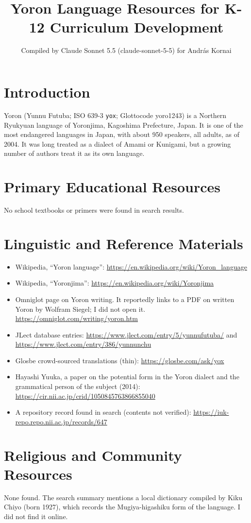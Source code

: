 \documentclass[12pt]{article}
\title{Yoron Language Resources for K-12 Curriculum Development}
\author{Compiled by Claude Sonnet 5.5 (claude-sonnet-5-5) for Andr\'as Kornai}
\date{}
\begin{document}
\maketitle

\section{Introduction}
Yoron (Yunnu Futuba; ISO 639-3 \texttt{yox}; Glottocode yoro1243) is a Northern Ryukyuan language of Yoronjima, Kagoshima Prefecture, Japan. It is one of the most endangered languages in Japan, with about 950 speakers, all adults, as of 2004. It was long treated as a dialect of Amami or Kunigami, but a growing number of authors treat it as its own language.

\section{Primary Educational Resources}
No school textbooks or primers were found in search results.

\section{Linguistic and Reference Materials}
\begin{itemize}
\item Wikipedia, ``Yoron language'': \url{https://en.wikipedia.org/wiki/Yoron_language}
\item Wikipedia, ``Yoronjima'': \url{https://en.wikipedia.org/wiki/Yoronjima}
\item Omniglot page on Yoron writing. It reportedly links to a PDF on written Yoron by Wolfram Siegel; I did not open it. \url{https://omniglot.com/writing/yoron.htm}
\item JLect database entries: \url{https://www.jlect.com/entry/5/yunnufutuba/} and \url{https://www.jlect.com/entry/386/yunnunchu}
\item Glosbe crowd-sourced translations (thin): \url{https://glosbe.com/ask/yox}
\item Hayashi Yuuka, a paper on the potential form in the Yoron dialect and the grammatical person of the subject (2014): \url{https://cir.nii.ac.jp/crid/1050845763866855040}
\item A repository record found in search (contents not verified): \url{https://iuk-repo.repo.nii.ac.jp/records/647}
\end{itemize}

\section{Religious and Community Resources}
None found. The search summary mentions a local dictionary compiled by Kiku Chiyo (born 1927), which records the Mugiya-higashiku form of the language. I did not find it online.
\end{document}

